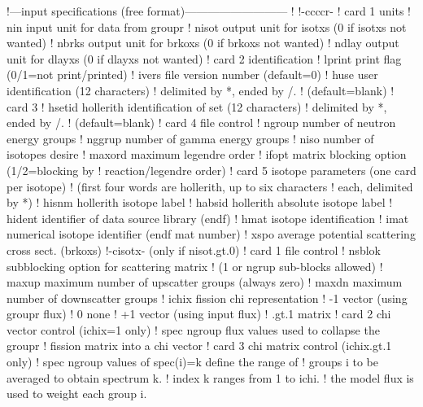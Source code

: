 \small
\begin{ccode}

   !---input specifications (free format)---------------------------
   !
   !-ccccr-
   ! card 1 units
   !    nin      input unit for data from groupr
   !    nisot    output unit for isotxs (0 if isotxs not wanted)
   !    nbrks    output unit for brkoxs (0 if brkoxs not wanted)
   !    ndlay    output unit for dlayxs (0 if dlayxs not wanted)
   ! card 2 identification
   !    lprint    print flag (0/1=not print/printed)
   !    ivers     file version number (default=0)
   !    huse      user identification (12 characters)
   !              delimited by *, ended by /.
   !              (default=blank)
   ! card 3
   !    hsetid    hollerith identification of set (12 characters)
   !              delimited by *, ended by /.
   !              (default=blank)
   ! card 4 file control
   !    ngroup    number of neutron energy groups
   !    nggrup    number of gamma energy groups
   !    niso      number of isotopes desire
   !    maxord    maximum legendre order
   !    ifopt     matrix blocking option (1/2=blocking by
   !                               reaction/legendre order)
   ! card 5 isotope parameters (one card per isotope)
   !       (first four words are hollerith, up to six characters
   !       each, delimited by *)
   !    hisnm     hollerith isotope label
   !    habsid    hollerith absolute isotope label
   !    hident    identifier of data source library (endf)
   !    hmat      isotope identification
   !    imat      numerical isotope identifier (endf mat number)
   !    xspo      average potential scattering cross sect. (brkoxs)
   !-cisotx- (only if nisot.gt.0)
   ! card 1 file control
   !    nsblok    subblocking option for scattering matrix
   !              (1 or ngrup sub-blocks allowed)
   !    maxup     maximum number of upscatter groups (always zero)
   !    maxdn     maximum number of downscatter groups
   !    ichix     fission chi representation
   !                   -1   vector (using groupr flux)
   !                    0   none
   !                   +1   vector (using input flux)
   !                .gt.1   matrix
   ! card 2 chi vector control (ichix=1 only)
   !    spec      ngroup flux values used to collapse the groupr
   !              fission matrix into a chi vector
   ! card 3 chi matrix control (ichix.gt.1 only)
   !    spec      ngroup values of spec(i)=k define the range of
   !              groups i to be averaged to obtain spectrum k.
   !              index k ranges from 1 to ichi.
   !              the model flux is used to weight each group i.

\end{ccode}
